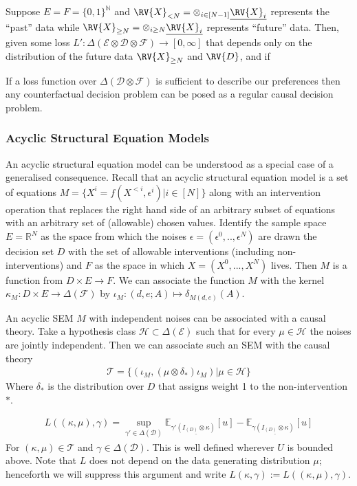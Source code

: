 Suppose $E=F=\{0,1\}^\mathbb{N}$ and $\RV{X}_{<N}=\otimes_{i\in [N-1]} \underline{\RV{X}_i}$ represents the ``past'' data while $\RV{X}_{\geq N}=\otimes_{i\geq N} \underline{\RV{X}_i}$ represents ``future'' data. Then, given some loss $L':\Delta(\mathcal{E}\otimes \mathcal{D}\otimes\mathcal{F})\to[0,\infty]$ that depends only on the distribution of the future data $\RV{X}_{\geq N}$ and $\RV{D}$, and if 

If a loss function over $\Delta(\mathcal{D}\otimes\mathcal{F})$ is sufficient to describe our preferences then any counterfactual decision problem can be posed as a regular causal decision problem.

\subsubsection{Acyclic Structural Equation Models}

An acyclic structural equation model can be understood as a special case of a generalised consequence. Recall that an acyclic structural equation model is a set of equations $M=\{X^i = f(X^{<i},\epsilon^i)|i\in[N]\}$ along with an intervention operation that replaces the right hand side of an arbitrary subset of equations with an arbitrary set of (allowable) chosen values. Identify the sample space $E=\mathbb{R}^N$ as the space from which the noises $\epsilon=(\epsilon^0,..,\epsilon^N)$ are drawn the decision set $D$ with the set of allowable interventions (including non-interventions) and $F$ as the space in which $X=(X^0,...,X^N)$ lives. Then $M$ is a function from $D\times E\to F$. We can associate the function $M$ with the kernel $\kappa_M: D\times E\to \Delta(\mathcal{F})$ by $\iota_M:(d,e;A)\mapsto \delta_{M(d,e)}(A)$.

An acyclic SEM $M$ with independent noises can be associated with a causal theory. Take a hypothesis class $\mathscr{H}\subset\Delta(\mathcal{E})$ such that for every $\mu\in\mathscr{H}$ the noises are jointly independent. Then we can associate such an SEM with the causal theory
\begin{align}
    \mathscr{T} = \{(\iota_M,(\mu\otimes \delta_*)\iota_M )|\mu\in\mathscr{H}\}
\end{align}
Where $\delta_*$ is the distribution over $D$ that assigns weight 1 to the non-intervention $*$.


\begin{align}
    L((\kappa,\mu),\gamma) = \sup_{\gamma'\in\Delta(\mathcal{D})} \mathbb{E}_{\gamma'\underline{(I_{(D)}\otimes \kappa)}}[u] - \mathbb{E}_{\gamma\underline{(I_{(D)}\otimes \kappa)}}[u]
\end{align}
For $(\kappa,\mu)\in \mathscr{T}$ and $\gamma\in \Delta(\mathcal{D})$. This is well defined wherever $U$ is bounded above. Note that $L$ does not depend on the data generating distribution $\mu$; henceforth we will suppress this argument and write $L(\kappa,\gamma):= L((\kappa,\mu),\gamma)$.


